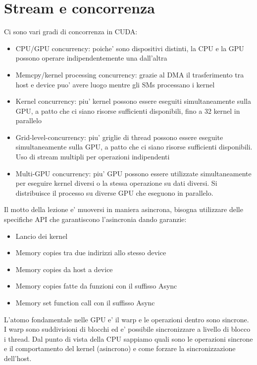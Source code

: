 \section{Stream e concorrenza}
Ci sono vari gradi di concorrenza in CUDA:
\begin{itemize}
    \item CPU/GPU concurrency: poiche' sono dispositivi distinti, la CPU e la GPU possono operare indipendentemente una dall'altra
    \item Memcpy/kernel processing concurrency: grazie al DMA il trasferimento tra host e device puo' avere luogo mentre gli SMs processano i kernel
    \item Kernel concurrency: piu' kernel possono essere eseguiti simultaneamente sulla GPU, a patto che ci siano risorse sufficienti disponibili, fino a 32 kernel in parallelo
    \item Grid-level-concurrency: piu' griglie di thread possono essere eseguite simultaneamente sulla GPU, a patto che ci siano risorse sufficienti disponibili. Uso di stream multipli per operazioni indipendenti
    \item Multi-GPU concurrency: piu' GPU possono essere utilizzate simultaneamente per eseguire kernel diversi o la stessa operazione su dati diversi. Si distribuisce il processo su diverse GPU che eseguono in parallelo.
\end{itemize}

Il motto della lezione e' muoversi in maniera asincrona, bisogna utilizzare delle specifiche API che garantiscono l'asincronia dando garanzie:
\begin{itemize}
    \item Lancio dei kernel
    \item Memory copies tra due indirizzi allo stesso device
    \item Memory copies da host a device 
    \item Memory copies fatte da funzioni con il suffisso Async
    \item Memory set function call con il suffisso Async
\end{itemize}

L'atomo fondamentale nelle GPU e' il warp e le operazioni dentro sono sincrone. I warp sono suddivisioni di blocchi ed e' possibile sincronizzare a livello di blocco i thread. Dal punto di vista della CPU sappiamo quali sono le operazioni sincrone e il comportamento del kernel (asincrono) e come forzare la sincronizzazione dell'host.


